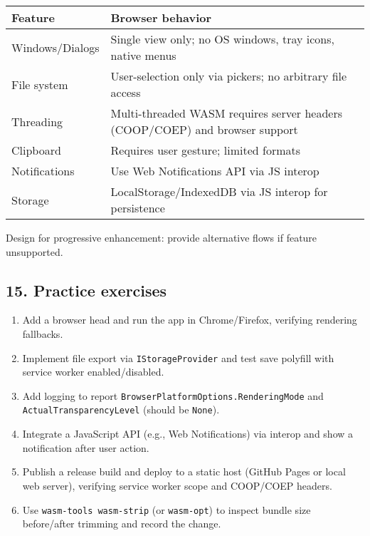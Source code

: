 \begin{longtable}[]{@{}
  >{\raggedright\arraybackslash}p{}
  >{\raggedright\arraybackslash}p{}@{}}
\toprule\noalign{}
\begin{minipage}[b]{\linewidth}\raggedright
Feature
\end{minipage} & \begin{minipage}[b]{\linewidth}\raggedright
Browser behavior
\end{minipage} \\
\midrule\noalign{}
\endhead
\bottomrule\noalign{}
\endlastfoot
Windows/Dialogs & Single view only; no OS windows, tray icons, native
menus \\
File system & User-selection only via pickers; no arbitrary file
access \\
Threading & Multi-threaded WASM requires server headers (COOP/COEP) and
browser support \\
Clipboard & Requires user gesture; limited formats \\
Notifications & Use Web Notifications API via JS interop \\
Storage & LocalStorage/IndexedDB via JS interop for persistence \\
\end{longtable}

Design for progressive enhancement: provide alternative flows if feature
unsupported.

\subsection{15. Practice exercises}\label{practice-exercises-14}

\begin{enumerate}
\def\labelenumi{\arabic{enumi}.}
\tightlist
\item
  Add a browser head and run the app in Chrome/Firefox, verifying
  rendering fallbacks.
\item
  Implement file export via \passthrough{\lstinline!IStorageProvider!}
  and test save polyfill with service worker enabled/disabled.
\item
  Add logging to report
  \passthrough{\lstinline!BrowserPlatformOptions.RenderingMode!} and
  \passthrough{\lstinline!ActualTransparencyLevel!} (should be
  \passthrough{\lstinline!None!}).
\item
  Integrate a JavaScript API (e.g., Web Notifications) via interop and
  show a notification after user action.
\item
  Publish a release build and deploy to a static host (GitHub Pages or
  local web server), verifying service worker scope and COOP/COEP
  headers.
\item
  Use \passthrough{\lstinline!wasm-tools wasm-strip!} (or
  \passthrough{\lstinline!wasm-opt!}) to inspect bundle size
  before/after trimming and record the change.
\end{enumerate}

